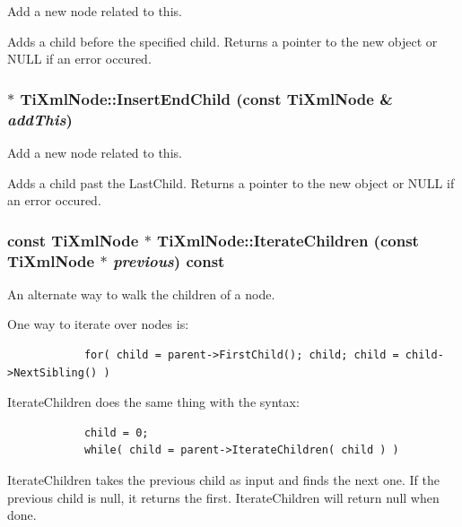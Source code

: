 Add a new node related to this. 

Adds a child before the specified child. Returns a pointer to the new object or NULL if an error occured.
\subsubsection{ $\ast$ Ti\-Xml\-Node::Insert\-End\-Child (const {\bf Ti\-Xml\-Node} \& {\em add\-This})\hspace{0.3cm}{\tt  [inherited]}}\label{classTiXmlNode_TiXmlUnknowna32}


Add a new node related to this. 

Adds a child past the Last\-Child. Returns a pointer to the new object or NULL if an error occured.
\subsubsection{\setlength{\rightskip}{0pt plus 5cm}const {\bf Ti\-Xml\-Node} $\ast$ Ti\-Xml\-Node::Iterate\-Children (const {\bf Ti\-Xml\-Node} $\ast$ {\em previous}) const\hspace{0.3cm}{\tt  [inherited]}}\label{classTiXmlNode_TiXmlUnknowna26}


An alternate way to walk the children of a node. 

One way to iterate over nodes is: 

\footnotesize\begin{verbatim}
			for( child = parent->FirstChild(); child; child = child->NextSibling() )
		\end{verbatim}
\normalsize


Iterate\-Children does the same thing with the syntax: 

\footnotesize\begin{verbatim}
			child = 0;
			while( child = parent->IterateChildren( child ) )
		\end{verbatim}
\normalsize


Iterate\-Children takes the previous child as input and finds the next one. If the previous child is null, it returns the first. Iterate\-Children will return null when done.

